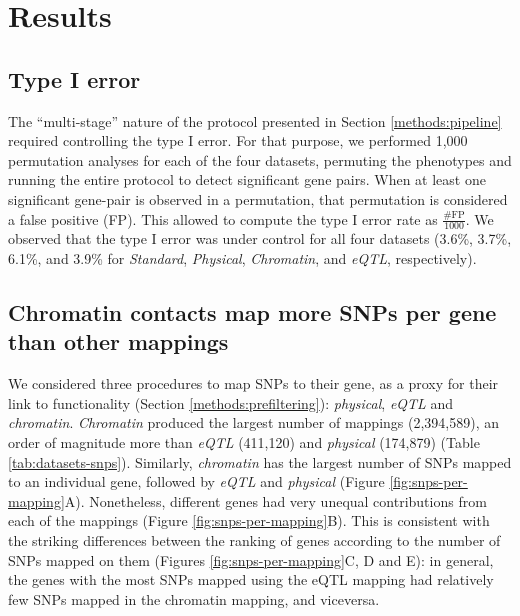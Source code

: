 \documentclass[
  11pt,
]{env/yjiao}
\begin{document}
\hypertarget{results}{%
\section{Results}\label{results}}

\hypertarget{type-i-error}{%
\subsection{Type I error}\label{type-i-error}}

The ``multi-stage'' nature of the protocol presented in Section
\ref{methods:pipeline} required controlling the type I error. For
that purpose, we performed 1,000 permutation analyses for each of the
four datasets, permuting the phenotypes and running the entire protocol
to detect significant gene pairs. When at least one significant
gene-pair is observed in a permutation, that permutation is considered a
false positive (FP). This allowed to compute the type I error rate as
\(\frac{ \text{\# FP}}{1000}\). We observed that the type I error was
under control for all four datasets (3.6\%, 3.7\%, 6.1\%, and 3.9\% for \emph{Standard},
\emph{Physical}, \emph{Chromatin}, and \emph{eQTL}, respectively).

\hypertarget{results-power-gain}{%
\subsection{Chromatin contacts map more SNPs per gene than other mappings}\label{results-power-gain}}

We considered three procedures to map SNPs to their gene, as a proxy for
their link to functionality (Section
\ref{methods:prefiltering}): \emph{physical}, \emph{eQTL} and \emph{chromatin}.
\emph{Chromatin} produced the largest number of mappings (2,394,589), an
order of magnitude more than \emph{eQTL} (411,120) and \emph{physical} (174,879)
(Table \ref{tab:datasets-snps}). Similarly, \emph{chromatin} has
the largest number of SNPs mapped to an individual gene, followed by \emph{eQTL} and
\emph{physical} (Figure \ref{fig:snps-per-mapping}A). Nonetheless,
different genes had very unequal contributions from each of the mappings
(Figure \ref{fig:snps-per-mapping}B). This is consistent with
the striking differences between the ranking of genes according to the number of
SNPs mapped on them (Figures \ref{fig:snps-per-mapping}C, D and E):
in general, the genes with the most SNPs mapped using the eQTL mapping had
relatively few SNPs mapped in the chromatin mapping, and viceversa.
\end{document}
